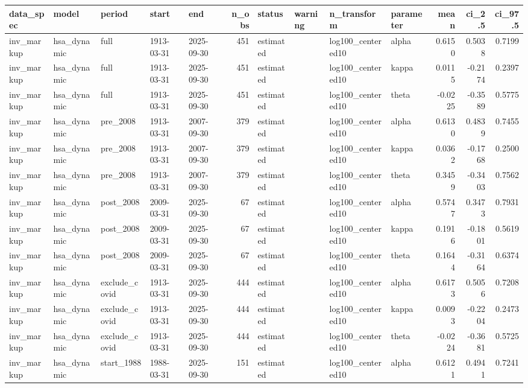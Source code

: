 \begin{tabular}{lllllrllllrrr}
\toprule
data\_spec & model & period & start & end & n\_obs & status & warning & n\_transform & parameter & mean & ci\_2.5 & ci\_97.5 \\
\midrule
inv\_markup & hsa\_dynamic & full & 1913-03-31 & 2025-09-30 & 451 & estimated &  & log100\_centered10 & alpha & 0.6150 & 0.5038 & 0.7199 \\
inv\_markup & hsa\_dynamic & full & 1913-03-31 & 2025-09-30 & 451 & estimated &  & log100\_centered10 & kappa & 0.0115 & -0.2174 & 0.2397 \\
inv\_markup & hsa\_dynamic & full & 1913-03-31 & 2025-09-30 & 451 & estimated &  & log100\_centered10 & theta & -0.0225 & -0.3589 & 0.5775 \\
inv\_markup & hsa\_dynamic & pre\_2008 & 1913-03-31 & 2007-09-30 & 379 & estimated &  & log100\_centered10 & alpha & 0.6130 & 0.4839 & 0.7455 \\
inv\_markup & hsa\_dynamic & pre\_2008 & 1913-03-31 & 2007-09-30 & 379 & estimated &  & log100\_centered10 & kappa & 0.0362 & -0.1768 & 0.2500 \\
inv\_markup & hsa\_dynamic & pre\_2008 & 1913-03-31 & 2007-09-30 & 379 & estimated &  & log100\_centered10 & theta & 0.3459 & -0.3403 & 0.7562 \\
inv\_markup & hsa\_dynamic & post\_2008 & 2009-03-31 & 2025-09-30 & 67 & estimated &  & log100\_centered10 & alpha & 0.5747 & 0.3473 & 0.7931 \\
inv\_markup & hsa\_dynamic & post\_2008 & 2009-03-31 & 2025-09-30 & 67 & estimated &  & log100\_centered10 & kappa & 0.1916 & -0.1801 & 0.5619 \\
inv\_markup & hsa\_dynamic & post\_2008 & 2009-03-31 & 2025-09-30 & 67 & estimated &  & log100\_centered10 & theta & 0.1644 & -0.3164 & 0.6374 \\
inv\_markup & hsa\_dynamic & exclude\_covid & 1913-03-31 & 2025-09-30 & 444 & estimated &  & log100\_centered10 & alpha & 0.6173 & 0.5056 & 0.7208 \\
inv\_markup & hsa\_dynamic & exclude\_covid & 1913-03-31 & 2025-09-30 & 444 & estimated &  & log100\_centered10 & kappa & 0.0093 & -0.2204 & 0.2473 \\
inv\_markup & hsa\_dynamic & exclude\_covid & 1913-03-31 & 2025-09-30 & 444 & estimated &  & log100\_centered10 & theta & -0.0224 & -0.3681 & 0.5725 \\
inv\_markup & hsa\_dynamic & start\_1988 & 1988-03-31 & 2025-09-30 & 151 & estimated &  & log100\_centered10 & alpha & 0.6121 & 0.4941 & 0.7241 \\

\end{tabular}
